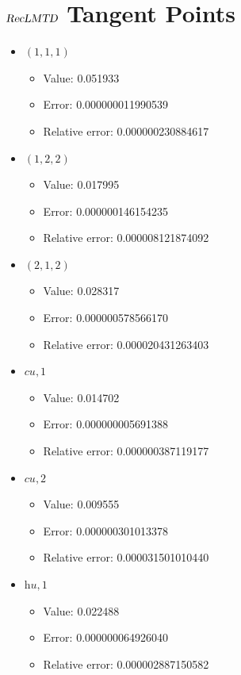 \documentclass{article}%
\begin{document}
\section{$\textsl{RecLMTD}$ Tangent Points}%
\thispagestyle{plain}%
\begin{itemize}%
	\item $(1, 1, 1)$%
	\begin{itemize}%
		\item Value: 0.051933%
		\item Error: 0.000000011990539%
		\item Relative error: 0.000000230884617%
	\end{itemize}%
	\item $(1, 2, 2)$%
	\begin{itemize}%
		\item Value: 0.017995%
		\item Error: 0.000000146154235%
		\item Relative error: 0.000008121874092%
	\end{itemize}%
	\item $(2, 1, 2)$%
	\begin{itemize}%
		\item Value: 0.028317%
		\item Error: 0.000000578566170%
		\item Relative error: 0.000020431263403%
	\end{itemize}%
	\item $\textit{cu},1$%
	\begin{itemize}%
		\item Value: 0.014702%
		\item Error: 0.000000005691388%
		\item Relative error: 0.000000387119177%
	\end{itemize}%
	\item $\textit{cu},2$%
	\begin{itemize}%
		\item Value: 0.009555%
		\item Error: 0.000000301013378%
		\item Relative error: 0.000031501010440%
	\end{itemize}%
	\item $\textit{hu},1$%
	\begin{itemize}%
		\item Value: 0.022488%
		\item Error: 0.000000064926040%
		\item Relative error: 0.000002887150582%
	\end{itemize}%
\end{itemize}%
\end{document}
